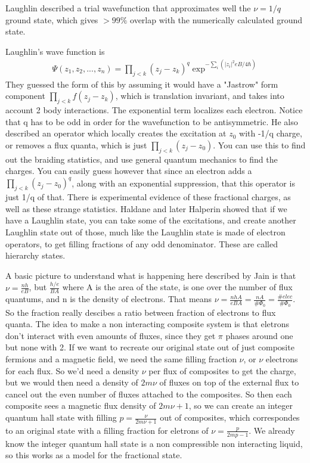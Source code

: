 Laughlin described a trial wavefunction that approximates well the $\nu = 1/q$ ground state, which gives $> 99\%$ overlap with the numerically calculated ground state.

Laughlin's wave function is 
\begin{align}
\Psi(z_1,z_2,...,z_n) = \prod_{j<k}(z_j-z_k)^q \exp^{-\sum_i(|z_i|^2eB/4\hbar)}
\end{align} 
They guessed the form of this by assuming it would have a "Jastrow" form component $\prod_{j<k}f(z_j-z_k)$, which is translation invariant, and takes into account 2 body interactions. The exponential term  localizes each electron. Notice that q has to be odd in order for the wavefunction to be antisymmetric. He also described an operator which locally creates the excitation at $z_0$ with -1/q charge, or removes a flux quanta, which is just $\prod_{j<k}(z_j-z_0)$. You can use this to find out the braiding statistics, and use general quantum mechanics to find the charges. You can easily guess however that since an electron adds a  $\prod_{j<k}(z_j-z_0)^q$, along with an exponential suppression, that this operator is just 1/q of that. There is experimental evidence of these fractional charges, as well as these strange statistics. Haldane and later Halperin showed that if we have a Laughlin state, you can take some of the excitations, and create another Laughlin state out of those, much like the Laughlin state is made of electron operators, to get filling fractions of any odd denominator. These are called hierarchy states. 

A basic picture to understand what is happening here described by Jain is that $\nu = \frac{nh}{eB}$, but $\frac{h/e}{BA}$ where A is the area of the state, is one over the number of flux quantums, and n is the density of electrons. That means $\nu = \frac{nhA}{eBA} = \frac{nA}{\#\Phi_0} = \frac{\#elec}{\#\Phi_0}$. So the fraction really descibes a ratio between fraction of electrons to flux quanta. The idea to make a non interacting composite system is that eletrons don't interact with even amounts of fluxes, since they get $\pi$ phases around one but none with 2. If we want to recreate our original state out of just composite fermions and a magnetic field, we need the same filling fraction $\nu$, or $\nu$ electrons for each flux. So we'd need a density $\nu$ per flux of composites to get the charge, but we would then need a density of $2m\nu$ of fluxes on top of the external flux to cancel out the even number of fluxes attached to the composites. So then each composite sees a magnetic flux density of $2m\nu+1$, so we can create an integer quantum hall state with filling $p = \frac{\nu}{2m\nu+1}$ out of composites, which correspondes to an original state with a filling fraction for eletrons of $\nu = \frac{p}{2mp-1}$. We already know the integer quantum hall state is a non compressible non interacting liquid, so this works as a model for the fractional state. 

